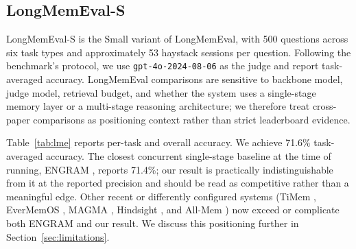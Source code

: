 \documentclass[11pt,a4paper]{article}
\begin{document}
\subsection{LongMemEval-S}
\label{sec:eval-lme}

LongMemEval-S is the Small variant of LongMemEval, with 500 questions across six task types and approximately 53 haystack sessions per question. Following the benchmark's protocol, we use \texttt{gpt-4o-2024-08-06} as the judge and report task-averaged accuracy. LongMemEval comparisons are sensitive to backbone model, judge model, retrieval budget, and whether the system uses a single-stage memory layer or a multi-stage reasoning architecture; we therefore treat cross-paper comparisons as positioning context rather than strict leaderboard evidence.

Table~\ref{tab:lme} reports per-task and overall accuracy. We achieve 71.6\% task-averaged accuracy. The closest concurrent single-stage baseline at the time of running, ENGRAM \citep{patel2025engram}, reports 71.4\%; our result is practically indistinguishable from it at the reported precision and should be read as competitive rather than a meaningful edge. Other recent or differently configured systems (TiMem \citep{li2026timem}, EverMemOS \citep{hu2026evermemos}, MAGMA \citep{jiang2026magma}, Hindsight \citep{latimer2025hindsight}, and All-Mem \citep{lv2026allmem}) now exceed or complicate both ENGRAM and our result. We discuss this positioning further in Section~\ref{sec:limitations}.
\end{document}
